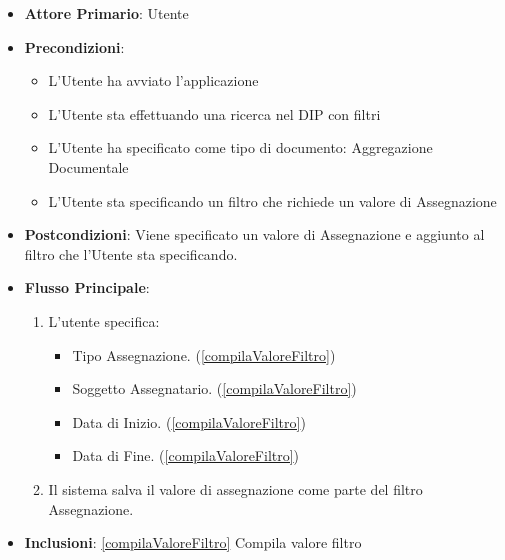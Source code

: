 \begin{itemize}
      \item \textbf{Attore Primario}: Utente
      \item \textbf{Precondizioni}: 
      \begin{itemize}
            \item L'Utente ha avviato l'applicazione
            \item L'Utente sta effettuando una ricerca nel DIP con filtri
            \item L'Utente ha specificato come tipo di documento: Aggregazione Documentale
            \item L'Utente sta specificando un filtro che richiede un valore di Assegnazione
      \end{itemize}
      \item \textbf{Postcondizioni}: Viene specificato un valore di Assegnazione e aggiunto al filtro che l'Utente sta specificando.
      \item \textbf{Flusso Principale}:
      \begin{enumerate}
            \item L'utente specifica:
            \begin{itemize}
                  \item Tipo Assegnazione. (\ref{compilaValoreFiltro})
                  \item Soggetto Assegnatario. (\ref{compilaValoreFiltro})
                  \item Data di Inizio. (\ref{compilaValoreFiltro})
                  \item Data di Fine. (\ref{compilaValoreFiltro})
            \end{itemize}
            \item Il sistema salva il valore di assegnazione come parte del filtro Assegnazione.
      \end{enumerate}
      \item \textbf{Inclusioni}: \ref{compilaValoreFiltro} Compila valore filtro
\end{itemize}
      
